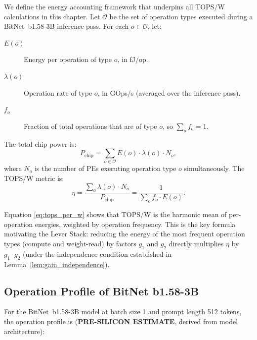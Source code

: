 We define the energy accounting framework that underpins all TOPS/W
calculations in this chapter.  Let \(\mathcal{O}\) be the set of
operation types executed during a BitNet~b1.58-3B inference pass.  For
each \(o \in \mathcal{O}\), let:

\begin{description}
  \item[\(E(o)\)] Energy per operation of type \(o\), in fJ/op.
  \item[\(\lambda(o)\)] Operation rate of type \(o\), in GOps/s (averaged
    over the inference pass).
  \item[\(f_{o}\)] Fraction of total operations that are of type \(o\),
    so \(\sum_{o} f_{o} = 1\).
\end{description}

The total chip power is:
\begin{equation}
  P_{\mathrm{chip}} = \sum_{o \in \mathcal{O}} E(o) \cdot \lambda(o) \cdot N_{o},
  \label{eq:p_chip}
\end{equation}
where \(N_{o}\) is the number of PEs executing operation type \(o\)
simultaneously.  The TOPS/W metric is:
\begin{equation}
  \eta = \frac{\sum_{o} \lambda(o) \cdot N_{o}}{P_{\mathrm{chip}}}
       = \frac{1}{\sum_{o} f_{o} \cdot E(o)}.
  \label{eq:tops_per_w}
\end{equation}

Equation \eqref{eq:tops_per_w} shows that TOPS/W is the harmonic mean of
per-operation energies, weighted by operation frequency.  This is the key
formula motivating the Lever Stack: reducing the energy of the most frequent
operation types (compute and weight-read) by factors \(g_{1}\) and \(g_{2}\)
directly multiplies \(\eta\) by \(g_{1} \cdot g_{2}\) (under the independence
condition established in Lemma~\ref{lem:gain_independence}).

\subsection{Operation Profile of BitNet b1.58-3B}

For the BitNet~b1.58-3B model \cite{bitnet_b158_2024} at batch size 1
and prompt length 512 tokens, the operation profile is
(\textbf{PRE-SILICON ESTIMATE}, derived from model architecture):

